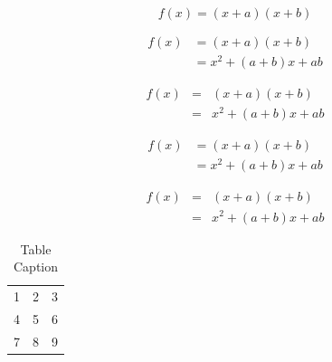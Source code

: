 \documentclass[preprint,12pt]{elsarticle}
\begin{document}
\begin{equation*}
f(x) = (x+a)(x+b)
\end{equation*}

\begin{align}
 f(x) &= (x+a)(x+b) \\
      &= x^2 + (a+b)x + ab
\end{align}

\begin{eqnarray}
 f(x) &=& (x+a)(x+b) \nonumber\\ %
      &=& x^2 + (a+b)x + ab
\end{eqnarray}

\begin{align*}
 f(x) &= (x+a)(x+b) \\
      &= x^2 + (a+b)x + ab
\end{align*}

\begin{eqnarray*}
 f(x)&=& (x+a)(x+b) \\
     &=& x^2 + (a+b)x + ab
\end{eqnarray*}


\begin{table}[t]%
\centering%
\begin{tabular}{l c r}%
  1 & 2 & 3 \\ %
  4 & 5 & 6 \\
  7 & 8 & 9 \\
\end{tabular}
\caption{Table Caption}\label{fig1}
\end{table}
\end{document}
